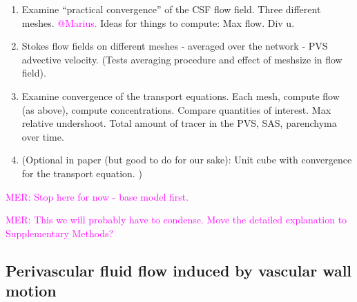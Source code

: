 \documentclass[fleqn,10pt]{wlscirep}
\newcommand{\mer}[1]{\textcolor{magenta}{#1}}
\begin{document}
\begin{enumerate}
\item
  Examine ``practical convergence'' of the CSF flow field. Three
  different meshes. \mer{@Marius.} Ideas for things to compute: Max
    flow. Div u.
\item
  Stokes flow fields on different meshes - averaged over the network -
  PVS advective velocity. (Tests averaging procedure and effect of
  meshsize in flow field).
\item
  Examine convergence of the transport equations. Each mesh, compute
  flow (as above), compute concentrations. Compare quantities of
  interest. Max relative undershoot. Total amount of tracer in the
  PVS, SAS, parenchyma over time.
\item
  (Optional in paper (but good to do for our sake): Unit cube with
  convergence for the transport equation. )
\end{enumerate}

\mer{MER: Stop here for now - base model first.}



\mer{MER: This we will probably have to condense. Move the detailed explanation to Supplementary Methods?}

\subsection*{Perivascular fluid flow induced by vascular wall motion}
\end{document}
